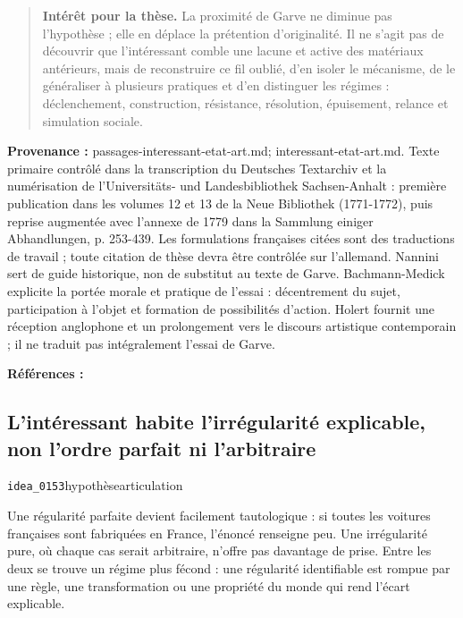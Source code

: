 \documentclass[10pt,a4paper]{article}
\begin{document}
\begin{quote}
\textbf{Intérêt pour la thèse.} La proximité de Garve ne diminue pas l'hypothèse ; elle en déplace la prétention d'originalité. Il ne s'agit pas de découvrir que l'intéressant comble une lacune et active des matériaux antérieurs, mais de reconstruire ce fil oublié, d'en isoler le mécanisme, de le généraliser à plusieurs pratiques et d'en distinguer les régimes : déclenchement, construction, résistance, résolution, épuisement, relance et simulation sociale.
\end{quote}
{\footnotesize\color{metadata}\textbf{Provenance :} passages-interessant-etat-art.md; interessant-etat-art.md. Texte primaire contrôlé dans la transcription du Deutsches Textarchiv et la numérisation de l'Universitäts- und Landesbibliothek Sachsen-Anhalt : première publication dans les volumes 12 et 13 de la Neue Bibliothek (1771-1772), puis reprise augmentée avec l'annexe de 1779 dans la Sammlung einiger Abhandlungen, p. 253-439. Les formulations françaises citées sont des traductions de travail ; toute citation de thèse devra être contrôlée sur l'allemand. Nannini sert de guide historique, non de substitut au texte de Garve. Bachmann-Medick explicite la portée morale et pratique de l'essai : décentrement du sujet, participation à l'objet et formation de possibilités d'action. Holert fournit une réception anglophone et un prolongement vers le discours artistique contemporain ; il ne traduit pas intégralement l'essai de Garve.\par}
{\footnotesize\color{metadata}\textbf{Références :} \parencite{garve1779interessirende,nannini2018garve,bachmannmedick2008anziehungskraft,holert2008interested,pachet2027virtuosite}\par}

\subsection{L'intéressant habite l'irrégularité explicable, non l'ordre parfait ni l'arbitraire}
{\small\color{metadata} \texttt{idea\_0153}\quad\textbullet\quad hypothèse\quad\textbullet\quad articulation\par}

Une régularité parfaite devient facilement tautologique : si toutes les voitures françaises sont fabriquées en France, l'énoncé renseigne peu. Une irrégularité pure, où chaque cas serait arbitraire, n'offre pas davantage de prise. Entre les deux se trouve un régime plus fécond : une régularité identifiable est rompue par une règle, une transformation ou une propriété du monde qui rend l'écart explicable.
\end{document}
